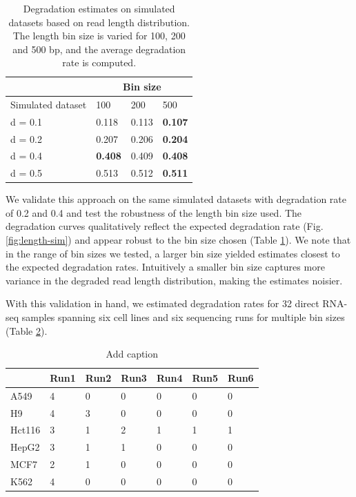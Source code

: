 \begin{table}[H]
  \centering
    \begin{tabular}{|p{3.5cm}|p{1.5cm}|p{1.5cm}|p{1.5cm}|}
\cline{2-4}    \multicolumn{1}{r|}{} & \multicolumn{3}{c|}{Bin size} \bigstrut\\
    \hline
    Simulated dataset & 100   & 200   & 500 \bigstrut\\
    \hline
    d = 0.1 & 0.118 & 0.113 & \textbf{0.107} \bigstrut\\
    \hline
    d = 0.2 & 0.207 & 0.206 & \textbf{0.204} \bigstrut\\
    \hline
    d = 0.4 & \textbf{0.408} & 0.409 & \textbf{0.408} \bigstrut\\
    \hline
    d = 0.5 & 0.513 & 0.512 & \textbf{0.511} \bigstrut\\
    \hline
    \end{tabular}%
  \caption[Degradation estimates on simulated datasets based on read length distribution]{Degradation estimates on simulated datasets based on read length distribution. The length bin size is varied for 100, 200 and 500 bp, and the average degradation rate is computed.}
  \label{tab:binsize}%
\end{table}%

We validate this approach on the same simulated datasets with degradation rate of 0.2 and 0.4 and test the robustness of the length bin size used. The degradation curves qualitatively reflect the expected degradation rate (Fig. \ref{fig:length-sim}) and appear robust to the bin size chosen (Table \ref{tab:binsize}). We note that in the range of bin sizes we tested, a larger bin size yielded estimates closest to the expected degradation rates. Intuitively a smaller bin size captures more variance in the degraded read length distribution, making the estimates noisier.         

With this validation in hand, we estimated degradation rates for 32 direct RNA-seq samples spanning six cell lines and six sequencing runs for multiple bin sizes (Table \ref{tab:six-six}). 

\begin{table}[H]
  \centering
  \caption{Add caption}
    \begin{tabular}{|p{1.5cm}|p{1.5cm}|p{1.5cm}|p{1.5cm}|p{1.5cm}|p{1.5cm}|p{1.5cm}|}
\cline{2-7}    \multicolumn{1}{l|}{} & Run1  & Run2  & Run3  & Run4  & Run5  & Run6 \bigstrut\\
    \hline
    A549  & 4     & 0     & 0     & 0     & 0     & 0 \bigstrut\\
    \hline
    H9    & 4     & 3     & 0     & 0     & 0     & 0 \bigstrut\\
    \hline
    Hct116 & 3     & 1     & 2     & 1     & 1     & 1 \bigstrut\\
    \hline
    HepG2 & 3     & 1     & 1     & 0     & 0     & 0 \bigstrut\\
    \hline
    MCF7  & 2     & 1     & 0     & 0     & 0     & 0 \bigstrut\\
    \hline
    K562  & 4     & 0     & 0     & 0     & 0     & 0 \bigstrut\\
    \hline
    \end{tabular}%
  \label{tab:six-six}%
\end{table}%


